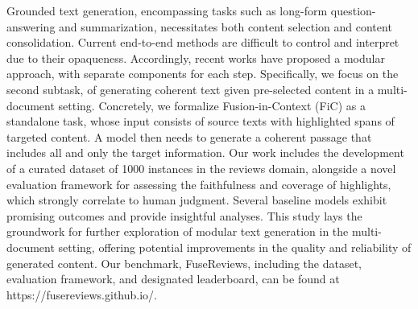 Grounded text generation, encompassing tasks such as long-form question-answering and summarization, necessitates both content selection and content consolidation. Current end-to-end methods are difficult to control and interpret due to their opaqueness. Accordingly, recent works have proposed a modular approach, with separate components for each step. Specifically, we focus on the second subtask, of generating coherent text given pre-selected content in a multi-document setting. Concretely, we formalize Fusion-in-Context (FiC) as a standalone task, whose input consists of source texts with highlighted spans of targeted content. A model then needs to generate a coherent passage that includes all and only the target information. Our work includes the development of a curated dataset of 1000 instances in the reviews domain, alongside a novel evaluation framework for assessing the faithfulness and coverage of highlights, which strongly correlate to human judgment. Several baseline models exhibit promising outcomes and provide insightful analyses. This study lays the groundwork for further exploration of modular text generation in the multi-document setting, offering potential improvements in the quality and reliability of generated content. Our benchmark, FuseReviews, including the dataset, evaluation framework, and designated leaderboard, can be found at https://fusereviews.github.io/.